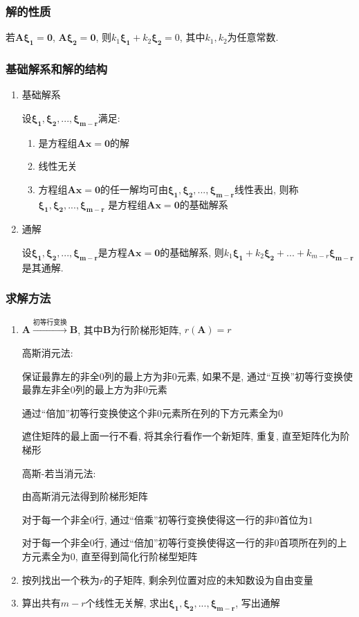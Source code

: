 \subsubsection{解的性质}
若$ \bm{A}\bm{\xi_{1}}=\bm{0} $, $ \bm{A}\bm{\xi_{2}}=\bm{0} $, 则$ k_{1}\bm{\xi_{1}}+k_{2}\bm{\xi_{2}}=0 $, 其中$ k_{1},k_{2} $为任意常数.
\subsubsection{基础解系和解的结构}
\begin{enumerate}
\item 基础解系\par
设$ \bm{\xi_{1}},\bm{\xi_{2}},...,\bm{\xi_{m-r}} $满足:
\begin{enumerate}
\item 是方程组$ \bm{A}\bm{x}=\bm{0} $的解
\item 线性无关
\item 方程组$ \bm{A}\bm{x}=\bm{0} $的任一解均可由$ \bm{\xi_{1}},\bm{\xi_{2}},...,\bm{\xi_{m-r}} $线性表出, 则称$ \bm{\xi_{1}},\bm{\xi_{2}},...,\bm{\xi_{m-r}} $ 是方程组$ \bm{A}\bm{x}=\bm{0} $的基础解系
\end{enumerate}
\item 通解\par
设$ \bm{\xi_{1}},\bm{\xi_{2}},...,\bm{\xi_{m-r}} $是方程$ \bm{A}\bm{x}=\bm{0} $的基础解系, 则$ k_{1}\bm{\xi_{1}}+k_{2}\bm{\xi_{2}}+...+k_{m-r}\bm{\xi_{m-r}} $是其通解.
\end{enumerate}
\subsubsection{求解方法}
\begin{enumerate}
\item $ \bm{A}\xrightarrow{\text{初等行变换}}\bm{B} $, 其中$ \bm{B} $为行阶梯形矩阵, $ r(\bm{A})=r $\par
高斯消元法: \par
{} 保证最靠左的非全$ 0 $列的最上方为非$ 0 $元素, 如果不是, 通过``互换''初等行变换使最靠左非全$ 0 $列的最上方为非$ 0 $元素\par
{} 通过``倍加''初等行变换使这个非$ 0 $元素所在列的下方元素全为$ 0 $\par
{} 遮住矩阵的最上面一行不看, 将其余行看作一个新矩阵, 重复, 直至矩阵化为阶梯形\par
高斯-若当消元法:\par
{} 由高斯消元法得到阶梯形矩阵\par
{} 对于每一个非全$ 0 $行, 通过``倍乘''初等行变换使得这一行的非$ 0 $首位为$ 1 $\par
{} 对于每一个非全$ 0 $行, 通过``倍加''初等行变换使得这一行的非$ 0 $首项所在列的上方元素全为$ 0 $, 直至得到简化行阶梯型矩阵
\item 按列找出一个秩为$ r $的子矩阵, 剩余列位置对应的未知数设为自由变量
\item 算出共有$ m-r $个线性无关解, 求出$ \bm{\xi_{1}},\bm{\xi_{2}},...,\bm{\xi_{m-r}} $, 写出通解
\end{enumerate}
